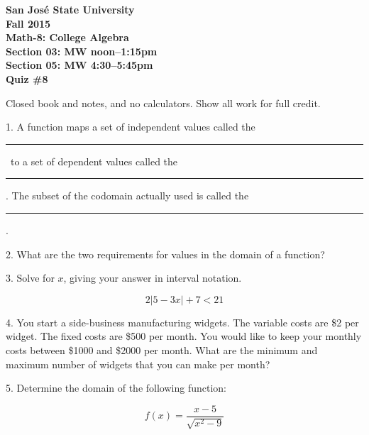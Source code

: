 \documentclass[letterpaper, 12pt]{article}
\begin{document}
\begin{center}
\bfseries
San Jos\'{e} State University \\
Fall 2015 \\
Math-8: College Algebra \\
Section 03: MW noon--1:15pm \\
Section 05: MW 4:30--5:45pm \\
\bigskip
Quiz \#8
\end{center}

\bigskip

Closed book and notes, and no calculators. Show all work for full credit.

\bigskip

\newcommand{\fillin}{\rule{1.5in}{1pt}}

1. A function maps a set of independent values called the \fillin\ to a set of
dependent values called the \fillin. The subset of the codomain actually used
is called the \fillin.

\vspace{1in}

2. What are the two requirements for values in the domain of a function?

\vspace{2in}

3. Solve for $x$, giving your answer in interval notation.

\[2|5-3x|+7<21\]

\newpage

4. You start a side-business manufacturing widgets. The variable costs are \$2
per widget. The fixed costs are \$500 per month. You would like to keep your
monthly costs between \$1000 and \$2000 per month. What are the minimum and
maximum number of widgets that you can make per month?

\vspace{3in}

5. Determine the domain of the following function:

\[f(x)=\frac{x-5}{\sqrt{x^2-9}}\]
\end{document}

